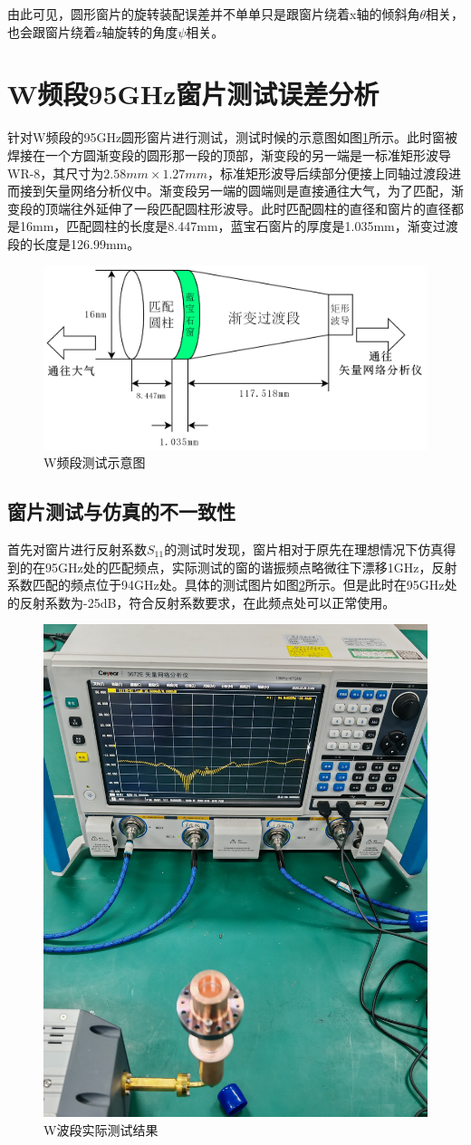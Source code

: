 \documentclass[master]{thesis-uestc}
\begin{document}
由此可见，圆形窗片的旋转装配误差并不单单只是跟窗片绕着x轴的倾斜角$\theta$相关，也会跟窗片绕着z轴旋转的角度$\psi$相关。
\section{W频段95GHz窗片测试误差分析}
针对W频段的95GHz圆形窗片进行测试，测试时候的示意图如图\ref{fig:W频段测试示意图}所示。此时窗被焊接在一个方圆渐变段的圆形那一段的顶部，渐变段的另一端是一标准矩形波导WR-8，其尺寸为$2.58mm \times 1.27mm$，标准矩形波导后续部分便接上同轴过渡段进而接到矢量网络分析仪中。渐变段另一端的圆端则是直接通往大气，为了匹配，渐变段的顶端往外延伸了一段匹配圆柱形波导。此时匹配圆柱的直径和窗片的直径都是16mm，匹配圆柱的长度是8.447mm，蓝宝石窗片的厚度是1.035mm，渐变过渡段的长度是126.99mm。
\begin{figure}[!htb]
    \centering
    \includegraphics[width=0.5\linewidth]{pic/chapter5/W频段测试示意图.png}
    \caption{W频段测试示意图}
    \label{fig:W频段测试示意图}
\end{figure}

\subsection{窗片测试与仿真的不一致性}

首先对窗片进行反射系数$S_{11}$的测试时发现，窗片相对于原先在理想情况下仿真得到的在95GHz处的匹配频点，实际测试的窗的谐振频点略微往下漂移1GHz，反射系数匹配的频点位于94GHz处。具体的测试图片如图\ref{fig:W波段实际测试结果}所示。但是此时在95GHz处的反射系数为-25dB，符合反射系数要求，在此频点处可以正常使用。
\begin{figure}[!htb]
    \centering
    \includegraphics[width=0.35\linewidth]{pic/chapter5/实际测试的W波导窗.jpg}
    \caption{W波段实际测试结果}
    \label{fig:W波段实际测试结果}
\end{figure}
\end{document}
